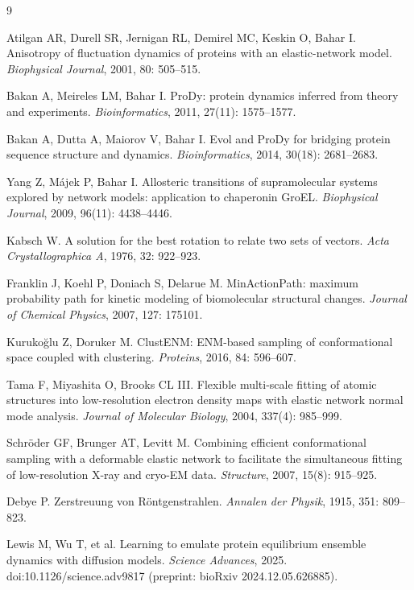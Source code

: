 \documentclass[11pt]{article}
\begin{document}
\begin{thebibliography}{9}\small

Atilgan AR, Durell SR, Jernigan RL, Demirel MC, Keskin O, Bahar I.
Anisotropy of fluctuation dynamics of proteins with an elastic-network model.
\emph{Biophysical Journal}, 2001, 80: 505--515.

Bakan A, Meireles LM, Bahar I.
ProDy: protein dynamics inferred from theory and experiments.
\emph{Bioinformatics}, 2011, 27(11): 1575--1577.

Bakan A, Dutta A, Maiorov V, Bahar I.
Evol and ProDy for bridging protein sequence structure and dynamics.
\emph{Bioinformatics}, 2014, 30(18): 2681--2683.

Yang Z, M\'ajek P, Bahar I.
Allosteric transitions of supramolecular systems explored by network models:
application to chaperonin GroEL.
\emph{Biophysical Journal}, 2009, 96(11): 4438--4446.

Kabsch W.
A solution for the best rotation to relate two sets of vectors.
\emph{Acta Crystallographica A}, 1976, 32: 922--923.

Franklin J, Koehl P, Doniach S, Delarue M.
MinActionPath: maximum probability path for kinetic modeling of biomolecular
structural changes.
\emph{Journal of Chemical Physics}, 2007, 127: 175101.

Kuruko\u{g}lu Z, Doruker M.
ClustENM: ENM-based sampling of conformational space coupled with clustering.
\emph{Proteins}, 2016, 84: 596--607.

Tama F, Miyashita O, Brooks CL III.
Flexible multi-scale fitting of atomic structures into low-resolution electron
density maps with elastic network normal mode analysis.
\emph{Journal of Molecular Biology}, 2004, 337(4): 985--999.

Schr\"oder GF, Brunger AT, Levitt M.
Combining efficient conformational sampling with a deformable elastic network
to facilitate the simultaneous fitting of low-resolution X-ray and cryo-EM
data. \emph{Structure}, 2007, 15(8): 915--925.

Debye P.
Zerstreuung von R\"ontgenstrahlen.
\emph{Annalen der Physik}, 1915, 351: 809--823.

Lewis M, Wu T, et al.
Learning to emulate protein equilibrium ensemble dynamics with diffusion
models. \emph{Science Advances}, 2025. doi:10.1126/science.adv9817
(preprint: bioRxiv 2024.12.05.626885).

\end{thebibliography}
\end{document}
